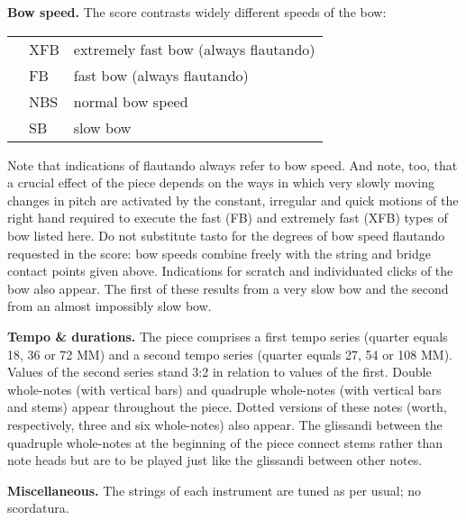\textbf{Bow speed.} The score contrasts  widely different speeds of the bow:
 
\begin{tabular}{l l l}
\phantom{M} & XFB & extremely fast bow (always flautando) \\
            & FB & fast bow (always flautando) \\
            & NBS & normal bow speed \\
            & SB & slow bow \\
\end{tabular}

Note that indications of flautando always refer to bow speed. And note, too,
that a crucial effect of the piece depends on the ways in which very slowly
moving changes in pitch are activated by the constant, irregular and quick
motions of the right hand required to execute the fast (FB) and extremely fast
(XFB) types of bow listed here. Do not substitute tasto for the degrees of bow
speed flautando requested in the score: bow speeds combine freely with the
string and bridge contact points given above. Indications for scratch and
individuated clicks of the bow also appear. The first of these results from a
very slow bow and the second from an almost impossibly slow bow.

\textbf{Tempo \& durations.} The piece comprises a first tempo series (quarter
equals 18, 36 or 72 MM) and a second tempo series (quarter equals 27, 54 or 108
MM). Values of the second series stand 3:2 in relation to values of the first.
Double whole-notes (with vertical bars) and quadruple whole-notes (with
vertical bars and stems) appear throughout the piece. Dotted versions of these
notes (worth, respectively, three and six whole-notes) also appear. The
glissandi between the quadruple whole-notes at the beginning of the piece
connect stems rather than note heads but are to be played just like the
glissandi between other notes.

\textbf{Miscellaneous.} The strings of each instrument are tuned as per usual;
no scordatura.
